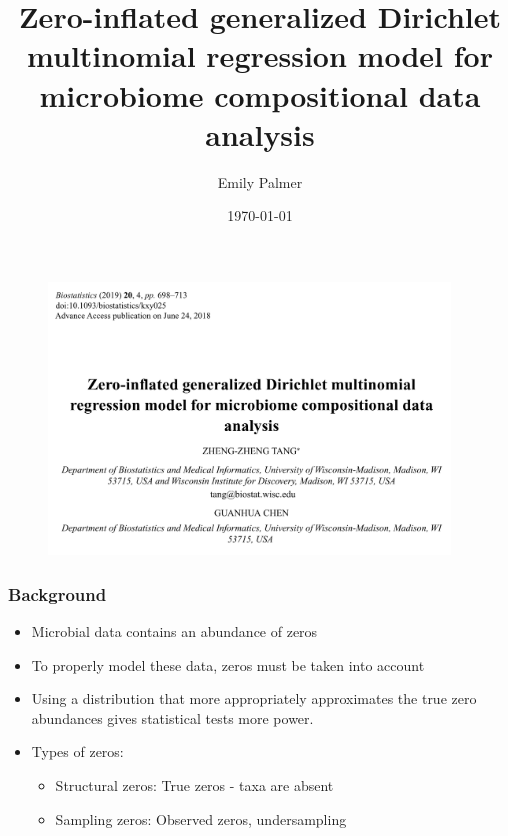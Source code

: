 \documentclass{beamer}
\title[Journal Club Feb 10 2022]{Zero-inflated generalized Dirichlet multinomial regression model for microbiome compositional data analysis } %
\author{Emily Palmer} %
\institute[OSU] %
  {Oregon State University \\ %
    \medskip
    \textit{palmerem@oregonstate.edu} %
  }
\date{\today} %
\begin{document}
  \begin{frame}
  \titlepage %
  \end{frame}




  \begin{frame}
  \frametitle{}
  \begin{figure}[!htb]
	\centering
	\includegraphics[width=0.95\textwidth]{img/2022.02.10_Zero_Inflated_generalized_Dirichlet_Multinomial-00036a49.png}
\end{figure}
  \end{frame}


\begin{frame}
\frametitle{Background}
\begin{itemize}
  \item Microbial data contains an abundance of zeros
  \item To properly model these data, zeros must be taken into account
  \item Using a distribution that more appropriately approximates the true zero abundances gives statistical tests more power.
  \item Types of zeros:
    \begin{itemize}
      \item Structural zeros: True zeros - taxa are absent
      \item Sampling zeros: Observed zeros, undersampling
    \end{itemize}
\end{itemize}
\end{frame}
\end{document}
